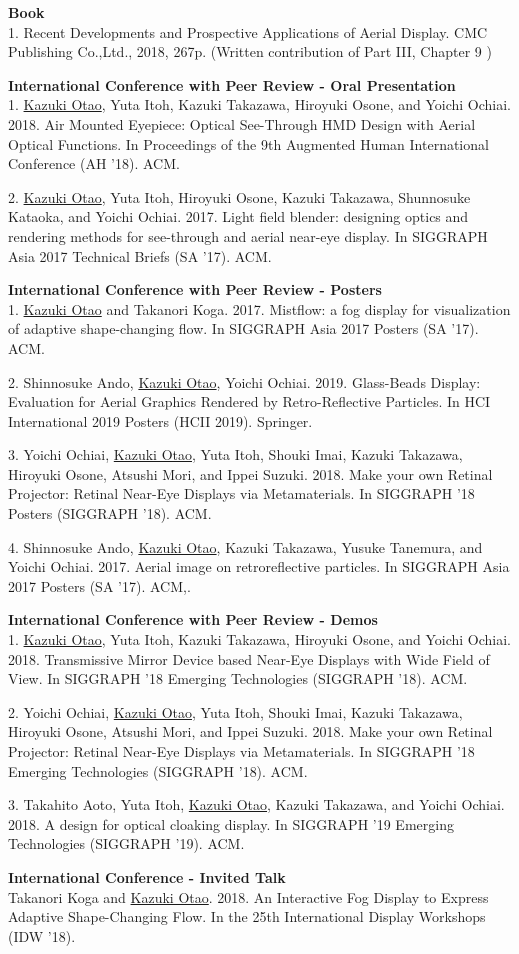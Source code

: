\documentclass[margin]{res}
\begin{document}
\begin{resume}
{\bf Book} \\
1. Recent Developments and Prospective Applications of Aerial Display. CMC Publishing Co.,Ltd., 2018, 267p. (Written contribution of Part III, Chapter 9 )

{\bf International Conference with Peer Review - Oral Presentation} \\
1. \underline{Kazuki Otao}, Yuta Itoh, Kazuki Takazawa, Hiroyuki Osone, and Yoichi Ochiai. 2018. Air Mounted Eyepiece: Optical See-Through HMD Design with Aerial Optical Functions. In Proceedings of the 9th Augmented Human International Conference (AH ’18). ACM.

2. \underline{Kazuki Otao}, Yuta Itoh, Hiroyuki Osone, Kazuki Takazawa, Shunnosuke Kataoka, and Yoichi Ochiai. 2017. Light field blender: designing optics and rendering methods for see-through and aerial near-eye display. In SIGGRAPH Asia 2017 Technical Briefs (SA '17). ACM.

{\bf International Conference with Peer Review - Posters} \\
1. \underline{Kazuki Otao} and Takanori Koga. 2017. Mistflow: a fog display for visualization of adaptive shape-changing flow. In SIGGRAPH Asia 2017 Posters (SA '17). ACM.

2. Shinnosuke Ando, \underline{Kazuki Otao}, Yoichi Ochiai. 2019. Glass-Beads Display: Evaluation for Aerial Graphics Rendered by Retro-Reflective Particles. In HCI International 2019 Posters (HCII 2019). Springer.

3. Yoichi Ochiai, \underline{Kazuki Otao}, Yuta Itoh, Shouki Imai, Kazuki Takazawa, Hiroyuki Osone, Atsushi Mori, and Ippei Suzuki. 2018. Make your own Retinal Projector: Retinal Near-Eye Displays via Metamaterials. In SIGGRAPH ’18 Posters (SIGGRAPH ’18). ACM.

4. Shinnosuke Ando, \underline{Kazuki Otao}, Kazuki Takazawa, Yusuke Tanemura, and Yoichi Ochiai. 2017. Aerial image on retroreflective particles. In SIGGRAPH Asia 2017 Posters (SA '17). ACM,.

{\bf International Conference with Peer Review - Demos} \\
1. \underline{Kazuki Otao}, Yuta Itoh, Kazuki Takazawa, Hiroyuki Osone, and Yoichi Ochiai. 2018. Transmissive Mirror Device based Near-Eye Displays with Wide Field of View. In SIGGRAPH ’18 Emerging Technologies (SIGGRAPH ’18). ACM.

2. Yoichi Ochiai, \underline{Kazuki Otao}, Yuta Itoh, Shouki Imai, Kazuki Takazawa, Hiroyuki Osone, Atsushi Mori, and Ippei Suzuki. 2018. Make your own Retinal Projector: Retinal Near-Eye Displays via Metamaterials. In SIGGRAPH ’18 Emerging Technologies (SIGGRAPH ’18). ACM.

3. Takahito Aoto, Yuta Itoh, \underline{Kazuki Otao}, Kazuki Takazawa, and Yoichi Ochiai. 2018. A design for optical cloaking display. In SIGGRAPH ’19 Emerging Technologies (SIGGRAPH ’19). ACM.

{\bf International Conference - Invited Talk} \\
Takanori Koga and \underline{Kazuki Otao}. 2018. An Interactive Fog Display to Express Adaptive Shape-Changing Flow. In the 25th International Display Workshops (IDW '18).

\end{resume}
\end{document}
